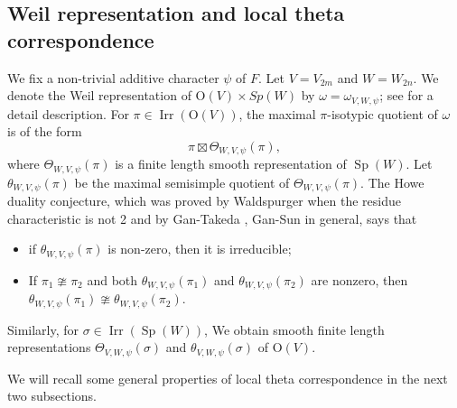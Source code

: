 \documentclass[article]{article}
\numberwithin{equation}{section}
\theoremstyle{definition}
\DeclareMathOperator{\SP}{Sp}
\DeclareMathOperator{\Irr}{Irr}
\begin{document}
\subsection{Weil representation and local theta correspondence}\label{localthteta}
We fix a non-trivial additive character $\psi$ of $F$. Let $V=V_{2m}$ and $W=W_{2n}$. We denote the Weil representation of $\mathrm O(V)\times Sp(W)$ by $\omega=\omega_{V,W,\psi}$; see \cite{MR1286835} for a detail description. For $\pi\in 
\Irr(\mathrm O(V))$, the maximal $\pi$-isotypic quotient of $\omega$ is of the form
$$\pi \boxtimes \Theta_{W,V,\psi}(\pi),$$
where $\Theta_{W,V,\psi}(\pi)$ is a finite length smooth representation of $\SP(W)$. Let $\theta_{W,V, \psi}(\pi)$ be the maximal semisimple quotient of $\Theta_{W,V, \psi}(\pi)$. The Howe duality conjecture, which was proved by Waldspurger \cite{MR1159105} when the residue characteristic is not 2 and by Gan-Takeda \cite{MR3454380}, Gan-Sun \cite{MR3753911} in general, says that 
\begin{itemize}
	\item if $\theta_{W, V,  \psi}(\pi)$ is non-zero, then it is  irreducible;
	\item If $\pi_1\ncong \pi_2$ and both $\theta_{W, V,  \psi}(\pi_1)$ and $\theta_{W, V,  \psi}(\pi_2)$ are nonzero, then $\theta_{W, V, \psi}(\pi_1)\ncong \theta_{W, V,  \psi}(\pi_2)$. 
\end{itemize}
Similarly, for $\sigma \in \Irr(\SP(W))$, We obtain smooth finite length representations $\Theta_{V,W, \psi}(\sigma)$ and $\theta_{V, W, \psi}(\sigma)$ of $\mathrm O(V)$.


We will recall some general properties of local theta correspondence in the next two subsections. 
\end{document}
